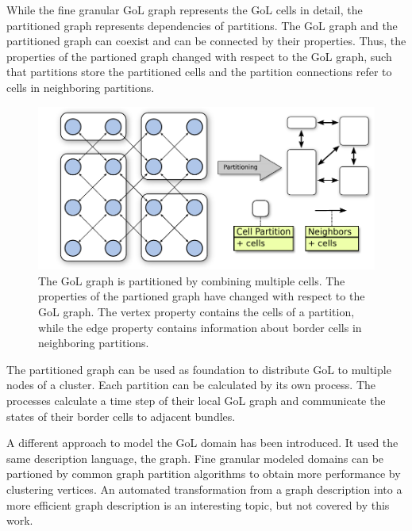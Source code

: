 While the fine granular GoL graph represents the GoL cells in detail,
the partitioned graph represents dependencies of partitions. The GoL
graph and the partitioned graph can coexist and can be connected by
their properties. Thus, the properties of the partioned graph changed
with respect to the GoL graph, such that partitions store the
partitioned cells and the partition connections refer to cells in
neighboring partitions.

\begin{figure}[H]
  \centering \includegraphics[width=\textwidth]{graphics/30_gol_bundle}
  \caption{The GoL graph is partitioned by combining multiple
    cells. The properties of the partioned graph have changed with
    respect to the GoL graph. The vertex property contains the cells
    of a partition, while the edge property contains information about
    border cells in neighboring partitions.}
  \label{fig:gol_bundle}
\end{figure}

\noindent The partitioned graph can be used as foundation to distribute GoL to
multiple nodes of a cluster. Each partition can be calculated by its own
process. The processes calculate a time step of their local GoL graph and
communicate the states of their border cells to adjacent bundles.

A different approach to model the GoL domain has been introduced.  It
used the same description language, the graph.  Fine granular modeled
domains can be partioned by common graph partition algorithms to
obtain more performance by clustering vertices. An automated
transformation from a graph description into a more efficient graph
description is an interesting topic, but not covered by this work.


